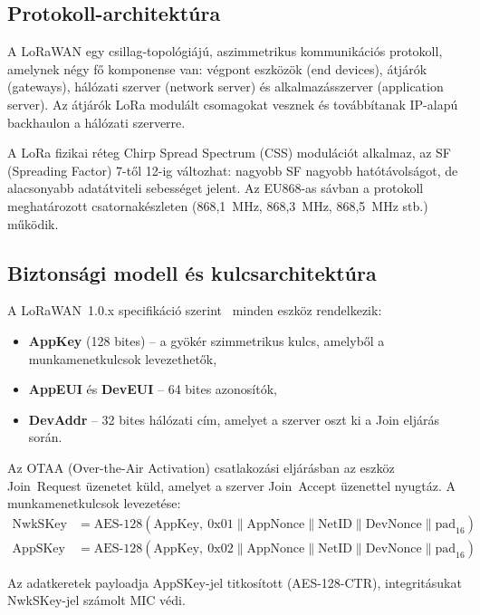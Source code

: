\documentclass[12pt,a4paper]{article}
\begin{document}
\subsection{Protokoll-architektúra}

A LoRaWAN egy csillag-topológiájú, aszimmetrikus kommunikációs protokoll,
amelynek négy fő komponense van: végpont eszközök (end devices), átjárók
(gateways), hálózati szerver (network server) és alkalmazásszerver
(application server). Az átjárók LoRa modulált csomagokat vesznek és
továbbítanak IP-alapú backhaulon a hálózati szerverre.

A LoRa fizikai réteg Chirp Spread Spectrum (CSS) modulációt alkalmaz,
az SF (Spreading Factor) 7-től 12-ig változhat: nagyobb SF nagyobb hatótávolságot,
de alacsonyabb adatátviteli sebességet jelent. Az EU868-as sávban a protokoll
meghatározott csatornakészleten (868,1~MHz, 868,3~MHz, 868,5~MHz stb.)
működik.

\subsection{Biztonsági modell és kulcsarchitektúra}

A LoRaWAN~1.0.x specifikáció szerint~\cite{lorawan104} minden eszköz rendelkezik:
\begin{itemize}
    \item \textbf{AppKey} (128 bites) -- a gyökér szimmetrikus kulcs, amelyből a
    munkamenetkulcsok levezethetők,
    \item \textbf{AppEUI} és \textbf{DevEUI} -- 64 bites azonosítók,
    \item \textbf{DevAddr} -- 32 bites hálózati cím, amelyet a szerver oszt ki
    a Join eljárás során.
\end{itemize}

Az OTAA (Over-the-Air Activation) csatlakozási eljárásban az eszköz Join~Request
üzenetet küld, amelyet a szerver Join~Accept üzenettel nyugtáz. A munkamenetkulcsok
levezetése:
\begin{align}
    \text{NwkSKey} &= \text{AES-128}(\text{AppKey},\ 0\text{x}01
    \mathbin\| \text{AppNonce} \mathbin\| \text{NetID} \mathbin\| \text{DevNonce}
    \mathbin\| \text{pad}_{16}) \\
    \text{AppSKey} &= \text{AES-128}(\text{AppKey},\ 0\text{x}02
    \mathbin\| \text{AppNonce} \mathbin\| \text{NetID} \mathbin\| \text{DevNonce}
    \mathbin\| \text{pad}_{16})
\end{align}

Az adatkeretek payloadja AppSKey-jel titkosított (AES-128-CTR), integritásukat
NwkSKey-jel számolt MIC védi.
\end{document}
